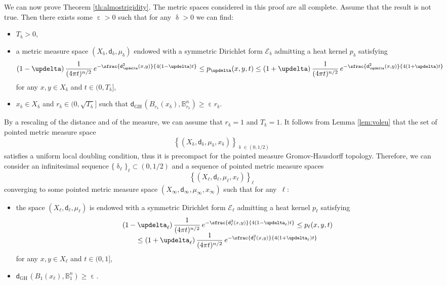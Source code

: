 \documentclass[10pt]{amsart}
\newcommand{\sGH}{{\scriptscriptstyle\mathrm{GH}\,}}
\theoremstyle{plain}
\theoremstyle{definition}
\newcommand{\setB}{\mathbb{B}}
\newcommand{\cE}{\mathcal{E}}
\newcommand{\dist}{\mathsf{d}}
\begin{document}
We can now prove Theorem \ref{th:almostrigidity}.
\proof The metric spaces considered in this proof are all complete. Assume that the result is not true. Then there exists some $\upepsilon>0$ such that for any $\updelta>0$ we can find:\begin{itemize}
\item $T_\updelta>0$,
\item a metric measure space $(X_\updelta,\dist_\updelta, \mu_\updelta)$ endowed with a symmetric Dirichlet form $\cE_\updelta$
admitting a heat kernel $p_\updelta$ satisfying
\[
(1-\updelta)\, \frac{1}{(4 \pi t)^{n/2}}\, e^{-\sfrac{\dist_\updelta^2(x,y)}{4(1-\updelta)t}}\le p_\updelta(x,y,t) \le (1+\updelta)\, \frac{1}{(4 \pi t)^{n/2}}\, e^{-\sfrac{\dist_\updelta^2(x,y)}{4(1+\updelta) t}}
\]
for any $x,y \in X_\updelta$ and $t\in (0,T_\updelta]$,
\item $x_\updelta\in X_\updelta$ and $r_\updelta\in (0,\sqrt{T_\updelta}]$ such that $\dist_{\sGH}\left(B_{r_\updelta}(x_\updelta), \setB^n_{r_\updelta}\right) \ge \upepsilon r_\updelta$.
\end{itemize}
By a rescaling of the distance and of the measure, we can assume that $r_\updelta=1$ and $T_\updelta=1$.
It follows from Lemma \ref{lem:voleu} that the set of pointed metric measure space
\[
\left\{(X_\updelta,\dist_\updelta,\mu_\updelta,x_\updelta)\right\}_{\updelta\in (0,1/2)}
\]
satisfies a uniform local doubling condition, thus it is precompact for the pointed measure Gromov-Hausdorff topology. Therefore, we can consider an infinitesimal sequence $\{\updelta_\ell\}_\ell \subset (0,1/2)$ and a sequence of pointed metric measure spaces
\[
\left\{(X_\ell,\dist_\ell,\mu_\ell,x_\ell)\right\}_{\ell}
\]
converging to some pointed metric measure space $(X_\infty,\dist_\infty,\mu_\infty,x_\infty)$ such that for any~$\ell$:
\begin{itemize}
\item the space $(X_\ell,\dist_\ell,\mu_\ell)$ is endowed with a symmetric Dirichlet form $\cE_\ell$
admitting a heat kernel $p_\ell$ satisfying
\begin{multline}\label{eq:14.17}
(1-\updelta_\ell)\, \frac{1}{(4 \pi t)^{n/2}}\, e^{-\sfrac{\dist_\ell^2(x,y)}{4(1-\updelta_\ell)t}}\le p_\ell(x,y,t)\\[-5pt]
\le (1+\updelta_\ell)\, \frac{1}{(4 \pi t)^{n/2}}\, e^{-\sfrac{\dist_\ell^2(x,y)}{4(1+\updelta_\ell)t}}
\end{multline}
for any $x,y \in X_\ell$ and $t\in (0,1]$,
\item $\dist_{\sGH}\left(B_1(x_\ell), \setB^n_1\right) \ge \upepsilon. $
\end{itemize}
\end{document}
